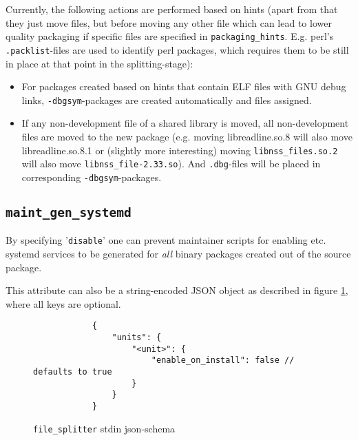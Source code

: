\documentclass[a4paper]{scrartcl}
\newcommand{\file}[1]{\texttt{#1}}
\begin{document}
	Currently, the following actions are performed based on hints (apart from that they just move files, but before moving any other file which can lead to lower quality packaging if specific files are specified in \texttt{packaging\_hints}. E.g. perl's \file{.packlist}-files are used to identify perl packages, which requires them to be still in place at that point in the splitting-stage):
	
	\begin{itemize}
		\item For packages created based on hints that contain ELF files with GNU debug links, \texttt{-dbgsym}-packages are created automatically and files assigned.
		
		\item If any non-development file of a shared library is moved, all non-development files are moved to the new package (e.g. moving libreadline.so.8 will also move libreadline.so.8.1 or (slightly more interesting) moving \file{libnss\_files.so.2} will also move \file{libnss\_file-2.33.so}). And \file{.dbg}-files will be placed in corresponding \texttt{-dbgsym}-packages.
	\end{itemize}

	\subsection{\texttt{maint\_gen\_systemd}}
	\label{sec:maint_gen_systemd}
	
	By specifying '\texttt{disable}' one can prevent maintainer scripts for enabling etc. systemd services to be generated for \textit{all} binary packages created out of the source package.
	
	This attribute can also be a string-encoded JSON object as described in figure \ref{fig:maint_gen_systemd_json}, where all keys are optional.
	
	\begin{figure}[H]
		\centering
		\begin{minipage}{0.8\textwidth}
			\begin{lstlisting}
			{
				"units": {
					"<unit>": {
						"enable_on_install": false // defaults to true
					}
				}
			}
			\end{lstlisting}
		\end{minipage}
		
		\caption{\texttt{file\_splitter} stdin json-schema}
		\label{fig:maint_gen_systemd_json}
	\end{figure}
	
	
\end{document}
